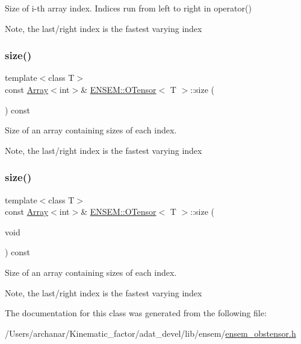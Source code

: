 Size of i-\/th array index. Indices run from left to right in operator() 

Note, the last/right index is the fastest varying index \mbox{\label{classENSEM_1_1OTensor_aa34f5311f161a9b4aef0b08af6fb8d34}} 
\subsubsection{\texorpdfstring{size()}{size()}\hspace{0.1cm}{\footnotesize\ttfamily [3/4]}}
{\footnotesize\ttfamily template$<$class T$>$ \\
const \mbox{\hyperlink{classXMLArray_1_1Array}{Array}}$<$int$>$\& \mbox{\hyperlink{classENSEM_1_1OTensor}{E\+N\+S\+E\+M\+::\+O\+Tensor}}$<$ T $>$\+::size (\begin{DoxyParamCaption}{ }\end{DoxyParamCaption}) const\hspace{0.3cm}{\ttfamily [inline]}}



Size of an array containing sizes of each index. 

Note, the last/right index is the fastest varying index \mbox{\label{classENSEM_1_1OTensor_aa34f5311f161a9b4aef0b08af6fb8d34}} 
\subsubsection{\texorpdfstring{size()}{size()}\hspace{0.1cm}{\footnotesize\ttfamily [4/4]}}
{\footnotesize\ttfamily template$<$class T$>$ \\
const \mbox{\hyperlink{classXMLArray_1_1Array}{Array}}$<$int$>$\& \mbox{\hyperlink{classENSEM_1_1OTensor}{E\+N\+S\+E\+M\+::\+O\+Tensor}}$<$ T $>$\+::size (\begin{DoxyParamCaption}\item[{void}]{ }\end{DoxyParamCaption}) const\hspace{0.3cm}{\ttfamily [inline]}}



Size of an array containing sizes of each index. 

Note, the last/right index is the fastest varying index 

The documentation for this class was generated from the following file\+:\begin{DoxyCompactItemize}
\item 
/\+Users/archanar/\+Kinematic\+\_\+factor/adat\+\_\+devel/lib/ensem/\mbox{\hyperlink{lib_2ensem_2ensem__obstensor_8h}{ensem\+\_\+obstensor.\+h}}\end{DoxyCompactItemize}
